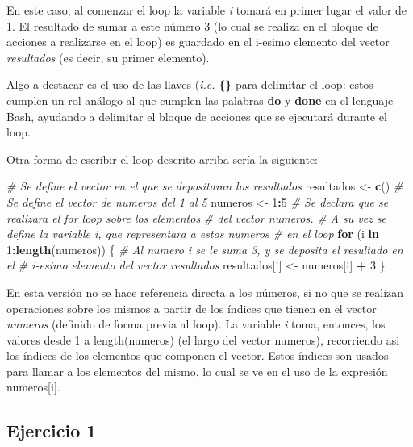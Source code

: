 \documentclass[]{article}
\newenvironment{Shaded}{\begin{snugshade}}{\end{snugshade}}
\newcommand{\CommentTok}[1]{\textcolor[rgb]{0.56,0.35,0.01}{\textit{#1}}}
\newcommand{\ControlFlowTok}[1]{\textcolor[rgb]{0.13,0.29,0.53}{\textbf{#1}}}
\newcommand{\DecValTok}[1]{\textcolor[rgb]{0.00,0.00,0.81}{#1}}
\newcommand{\KeywordTok}[1]{\textcolor[rgb]{0.13,0.29,0.53}{\textbf{#1}}}
\newcommand{\NormalTok}[1]{#1}
\newcommand{\OperatorTok}[1]{\textcolor[rgb]{0.81,0.36,0.00}{\textbf{#1}}}
\newcommand{\StringTok}[1]{\textcolor[rgb]{0.31,0.60,0.02}{#1}}
\begin{document}
En este caso, al comenzar el loop la variable \emph{i} tomará en primer
lugar el valor de 1. El resultado de sumar a este número 3 (lo cual se
realiza en el bloque de acciones a realizarse en el loop) es guardado en
el i-esimo elemento del vector \emph{resultados} (es decir, su primer
elemento).

Algo a destacar es el uso de las llaves (\emph{i.e.} \textbf{\{\}} para
delimitar el loop: estos cumplen un rol análogo al que cumplen las
palabras \textbf{do} y \textbf{done} en el lenguaje Bash, ayudando a
delimitar el bloque de acciones que se ejecutará durante el loop.

Otra forma de escribir el loop descrito arriba sería la siguiente:

\begin{Shaded}
\begin{Highlighting}[]
\CommentTok{# Se define el vector en el que se depositaran los resultados}
\NormalTok{resultados <-}\StringTok{ }\KeywordTok{c}\NormalTok{()}
\CommentTok{# Se define el vector de numeros del 1 al 5}
\NormalTok{numeros <-}\StringTok{ }\DecValTok{1}\OperatorTok{:}\DecValTok{5}
\CommentTok{# Se declara que se realizara el for loop sobre los elementos }
\CommentTok{# del vector numeros.}
\CommentTok{# A su vez se define la variable i, que representara a estos numeros }
\CommentTok{# en el loop}
\ControlFlowTok{for}\NormalTok{ (i }\ControlFlowTok{in} \DecValTok{1}\OperatorTok{:}\KeywordTok{length}\NormalTok{(numeros)) \{}
    \CommentTok{# Al numero i se le suma 3, y se deposita el resultado en el }
    \CommentTok{# i-esimo elemento del vector resultados}
\NormalTok{    resultados[i] <-}\StringTok{ }\NormalTok{numeros[i] }\OperatorTok{+}\StringTok{ }\DecValTok{3}
\NormalTok{\}}
\end{Highlighting}
\end{Shaded}

En esta versión no se hace referencia directa a los números, si no que
se realizan operaciones sobre los mismos a partir de los índices que
tienen en el vector \emph{numeros} (definido de forma previa al loop).
La variable \emph{i} toma, entonces, los valores desde 1 a
length(numeros) (el largo del vector numeros), recorriendo asi los
índices de los elementos que componen el vector. Estos índices son
usados para llamar a los elementos del mismo, lo cual se ve en el uso de
la expresión numeros{[}i{]}.

\hypertarget{ejercicio-1-1}{%
\subsection{Ejercicio 1}\label{ejercicio-1-1}}
\end{document}
